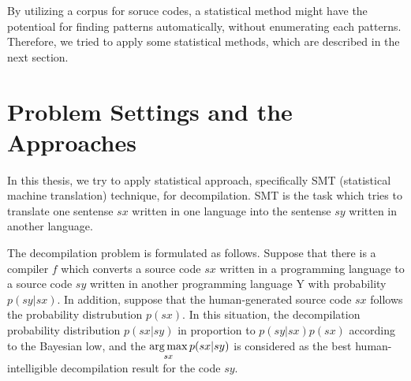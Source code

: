 \documentclass[senior,final,11pt]{iscs-thesis}
\newcommand{\argmax}{\mathop{\rm arg\,max}\limits}
\begin{document}
By utilizing a corpus for soruce codes, a statistical method might have the potentioal for finding patterns automatically, without enumerating each patterns.
Therefore, we tried to apply some statistical methods, which are described in the next section.















\section{Problem Settings and the Approaches}

In this thesis, we try to apply statistical approach, specifically SMT (statistical machine translation) technique, for decompilation.
SMT is the task which tries to translate one sentense $sx$ written in one language into the sentense $sy$ written in another language.

The decompilation problem is formulated as follows. 
Suppose that there is a compiler $ f $ which converts a source code $ sx $ written in a programming language 
to a source code $ sy $  written in another programming language Y with probability $p(sy|sx)$.
In addition, suppose that the human-generated source code $ sx $ follows the probability distrubution $ p(sx) $.
In this situation, the decompilation probability distribution $ p(sx|sy) $ in proportion to $ p(sy|sx)p(sx) $ according to the Bayesian low, 
and the $\argmax_{sx} p(sx|sy)$ is considered as the best human-intelligible decompilation result for the code $sy$.
\end{document}
